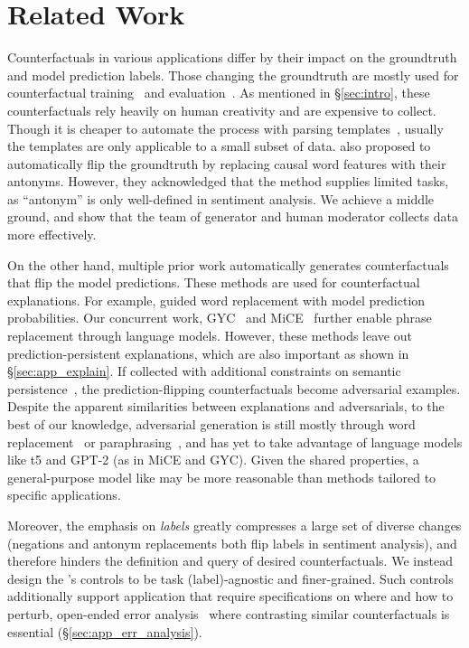 \section{Related Work}
\label{sec:relate}

Counterfactuals in various applications differ by their impact on the groundtruth and model prediction labels.
Those changing the groundtruth are mostly used for counterfactual training~\cite{kaushik2019learning, teney2020learning} and evaluation~\cite{gardner2020contrast, checklist:acl20}.
As mentioned in \S\ref{sec:intro}, these counterfactuals rely heavily on human creativity and are expensive to collect.
Though it is cheaper to automate the process with parsing templates~\cite{li2020linguistically}, usually the templates are only applicable to a small subset of data.
\citet{wang2020robustness} also proposed to automatically flip the groundtruth by replacing causal word features with their antonyms.
However, they acknowledged that the method supplies limited tasks, as ``antonym'' is only well-defined in sentiment analysis.
We achieve a middle ground, and show that the team of \sysname generator and human moderator collects data more effectively.

On the other hand, multiple prior work automatically generates counterfactuals that flip the model predictions.
These methods are used for counterfactual explanations.
For example, \citet{kang2020counterfactual} guided word replacement with model prediction probabilities.
Our concurrent work, GYC~\cite{madaan2020generate} and MiCE~\cite{ross2020explaining} further enable phrase replacement through language models.
However, these methods leave out prediction-persistent explanations, which are also important as shown in \S\ref{sec:app_explain}.
If collected with additional constraints on semantic persistence~\cite{morris2020textattack, alzantot-etal-2018-generating}, the prediction-flipping counterfactuals become adversarial examples.
Despite the apparent similarities between explanations and adversarials, to the best of our knowledge, adversarial generation is still mostly through word replacement~\cite{alzantot2018generating, garg2020bae, li2020contextualized} or paraphrasing~\cite{iyyer2018adversarial, malandrakis-etal-2019-controlled}, and has yet to take advantage of language models like t5 and GPT-2 (as in MiCE and GYC).
Given the shared properties, a general-purpose model like \sysname may be more reasonable than methods tailored to specific applications.

Moreover, the emphasis on \emph{labels} greatly compresses a large set of diverse changes (\eg negations and antonym replacements both flip labels in sentiment analysis), and therefore hinders the definition and query of desired counterfactuals.
We instead design the \sysname's controls to be task (label)-agnostic and finer-grained.
Such controls additionally support application that require specifications on where and how to perturb, \eg open-ended error analysis~\cite{wu2019errudite} where contrasting similar counterfactuals is essential (\S\ref{sec:app_err_analysis}).

